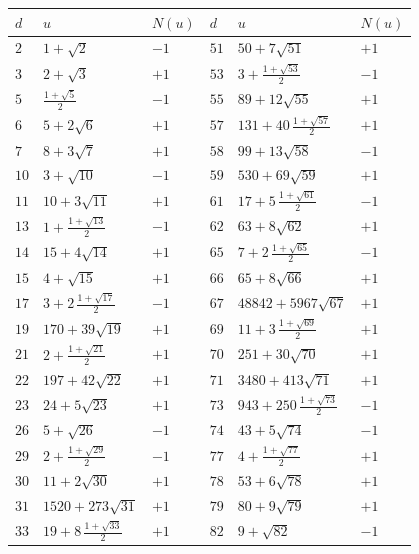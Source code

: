 \begin{center}
  \bgroup
  \def\arraystretch{1.65}
  \begin{tabular}{M{0.5cm}M{4cm}M{0.7cm}|M{0.5cm}M{4cm}M{0.7cm}}
    \hline
    $d$ & $u$ & $N (u)$ & $d$ & $u$ & $N (u)$ \\
    \hline
    $2$ & $1 + \sqrt{2}$ & $-1$ & $51$ & $50 + 7\sqrt{51}$ & $+1$ \\
    $3$ & $2 + \sqrt{3}$ & $+1$ & $53$ & $3 + \frac{1+\sqrt{53}}{2}$ & $-1$ \\
    $5$ & $\frac{1+\sqrt{5}}{2}$ & $-1$ & $55$ & $89 + 12\sqrt{55}$ & $+1$ \\
    $6$ & $5 + 2\sqrt{6}$ & $+1$ & $57$ & $131 + 40\,\frac{1+\sqrt{57}}{2}$ & $+1$ \\
    $7$ & $8 + 3\sqrt{7}$ & $+1$ & $58$ & $99 + 13\sqrt{58}$ & $-1$ \\
    $10$ & $3 + \sqrt{10}$ & $-1$ & $59$ & $530 + 69\sqrt{59}$ & $+1$ \\
    $11$ & $10 + 3\sqrt{11}$ & $+1$ & $61$ & $17 + 5\,\frac{1+\sqrt{61}}{2}$ & $-1$ \\
    $13$ & $1 + \frac{1+\sqrt{13}}{2}$ & $-1$ & $62$ & $63 + 8\sqrt{62}$ & $+1$ \\
    $14$ & $15 + 4\sqrt{14}$ & $+1$ & $65$ & $7 + 2\,\frac{1+\sqrt{65}}{2}$ & $-1$ \\
    $15$ & $4 + \sqrt{15}$ & $+1$ & $66$ & $65 + 8\sqrt{66}$ & $+1$ \\
    $17$ & $3 + 2\,\frac{1+\sqrt{17}}{2}$ & $-1$ & $67$ & $48842 + 5967\sqrt{67}$ & $+1$ \\
    $19$ & $170 + 39\sqrt{19}$ & $+1$ & $69$ & $11 + 3\,\frac{1+\sqrt{69}}{2}$ & $+1$ \\
    $21$ & $2 + \frac{1+\sqrt{21}}{2}$ & $+1$ & $70$ & $251 + 30\sqrt{70}$ & $+1$ \\
    $22$ & $197 + 42\sqrt{22}$ & $+1$ & $71$ & $3480 + 413\sqrt{71}$ & $+1$ \\
    $23$ & $24 + 5\sqrt{23}$ & $+1$ & $73$ & $943 + 250\,\frac{1+\sqrt{73}}{2}$ & $-1$ \\
    $26$ & $5 + \sqrt{26}$ & $-1$ & $74$ & $43 + 5\sqrt{74}$ & $-1$ \\
    $29$ & $2 + \frac{1+\sqrt{29}}{2}$ & $-1$ & $77$ & $4 + \frac{1+\sqrt{77}}{2}$ & $+1$ \\
    $30$ & $11 + 2\sqrt{30}$ & $+1$ & $78$ & $53 + 6\sqrt{78}$ & $+1$ \\
    $31$ & $1520 + 273\sqrt{31}$ & $+1$ & $79$ & $80 + 9\sqrt{79}$ & $+1$ \\
    $33$ & $19 + 8\,\frac{1+\sqrt{33}}{2}$ & $+1$ & $82$ & $9 + \sqrt{82}$ & $-1$ \\

\end{tabular}
\end{center}
